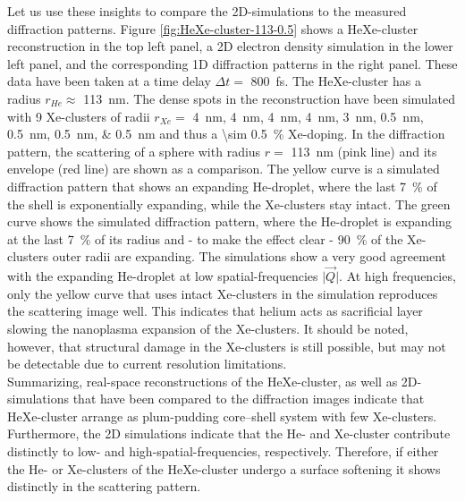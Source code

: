 Let us use these insights to compare the 2D-simulations to the measured diffraction patterns. Figure \ref{fig:HeXe-cluster-113-0.5} shows a HeXe-cluster reconstruction in the top left panel, a 2D electron density simulation in the lower left panel, and the corresponding 1D diffraction patterns in the right panel. These data have been taken at a time delay $\Delta t=$ \SI{800}{\femto\second}. The HeXe-cluster has a radius $r_{He}\approx$ \SI{113}{\nano\meter}. The dense spots in the reconstruction have been simulated with \num{9} Xe-clusters of radii $r_{Xe}=$ \SIlist{4;4;4;4;3;0.5;0.5;0.5;0.5}{\nano\meter} and thus a \SI{\sim 0.5}{\percent} Xe-doping. In the diffraction pattern, the scattering of a sphere with radius $r=$ \SI{113}{\nano\meter} (pink line) and its envelope (red line) are shown as a comparison. The yellow curve is a simulated diffraction pattern that shows an expanding He-droplet, where the last \SI{7}{\percent} of the shell is exponentially expanding, while the Xe-clusters stay intact. The green curve shows the simulated diffraction pattern, where the He-droplet is expanding at the last \SI{7}{\percent} of its radius and - to make the effect clear - \SI{90}{\percent} of the Xe-clusters outer radii are expanding. The simulations show a very good agreement with the expanding He-droplet at low spatial-frequencies $\lvert\vec{Q}\rvert$. At high frequencies, only the yellow curve that uses intact Xe-clusters in the simulation reproduces the scattering image well. This indicates that helium acts as sacrificial layer slowing the nanoplasma expansion of the Xe-clusters. It should be noted, however, that structural damage in the Xe-clusters is still possible, but may not be detectable due to current resolution limitations.\\[1\baselineskip]
%
Summarizing, real-space reconstructions of the HeXe-cluster, as well as 2D-simulations that have been compared to the diffraction images indicate that HeXe-cluster arrange as plum-pudding core--shell system with few Xe-clusters. Furthermore, the 2D simulations indicate that the He- and Xe-cluster contribute distinctly to low- and high-spatial-frequencies, respectively. Therefore, if either the He- or Xe-clusters of the HeXe-cluster undergo a surface softening it shows distinctly in the scattering pattern.
%
%
%
